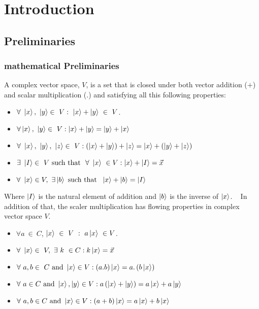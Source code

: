\chapter{Introduction}

\section{ Preliminaries }

\subsection*{ mathematical Preliminaries }

\begin{defn}


A complex vector space, $V$, is a set that is closed under both vector addition
($ +$) and scalar multiplication (.) and satisfying all this following properties:
\begin{itemize}
\item $\forall~ \ket{x},~\ket{y} \in ~ V : ~\ket{x}+\ket{y} ~\in~ V $.
\item $\forall \ket{x},~\ket{y} \in ~ V : \ket{x}+\ket{y}=\ket{y}+\ket{x}$
\item $\forall~ \ket{x},~\ket{y}, ~\ket{z} \in ~ V:\left(\ket{x}+\ket{y}\right)+\ket{z}=\ket{x}+\left(\ket{y}+\ket{z}\right)$
\item $\exists ~\ket{I} \in ~V~ \text{such that }~  \forall~ \ket{x} ~\in  V: \ket{x}+\ket{I}=\vec{x}$
\item $\forall ~\ket{x} \in V,~ \exists \ket{b} ~ \text{such that }  ~\ket{x}+\ket{b}= \ket{I}$
\end{itemize}
Where $\ket{I}$ is the natural element of addition and $\ket{b}$ is the inverse of $\ket{x}$. ~
In addition  of that, the scaler  multiplication has flowing properties in complex vector space $V$.
\begin{itemize}
\item $\forall a~\in ~C$, $\ket{x}~\in ~V~ :~ a\ket{x}~ \in V$.
\item $\forall ~\ket{x} \in ~V,~ \exists~ k ~\in C :k\ket{x}=\vec{x}$
\item $\forall ~ a,b \in ~C ~\text{and} ~ \ket{x}\in V :\left(a.b\right) \ket{x}=a.\left(b \ket{x}\right)$
\item $\forall ~ a \in C ~\text{and} ~ \ket{x}, \ket{y}\in V:a\left(\ket{x}+\ket{y}\right)=a\ket{x}+a\ket{y}$
\item $\forall ~ a,b \in C ~\text{and} ~ \ket{x}\in V:\left(a+b\right)\ket{x}=a\ket{x}+b\ket{x}$
\end{itemize}
\end{defn}

